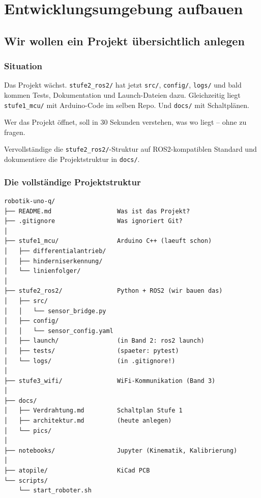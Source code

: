 \part{Entwicklungsumgebung aufbauen}

\chapter{Wir wollen ein Projekt übersichtlich anlegen}

\kapitelstruktur

\section{Situation}

Das Projekt wächst. \texttt{stufe2\_ros2/} hat jetzt
\texttt{src/}, \texttt{config/}, \texttt{logs/} und bald
kommen Tests, Dokumentation und Launch-Dateien dazu.
Gleichzeitig liegt \texttt{stufe1\_mcu/} mit Arduino-Code
im selben Repo. Und \texttt{docs/} mit Schaltplänen.

Wer das Projekt öffnet, soll in 30 Sekunden verstehen,
was wo liegt -- ohne zu fragen.

\begin{aufgabeBox}
Vervollständige die \texttt{stufe2\_ros2/}-Struktur auf
ROS2-kompatiblen Standard und dokumentiere die Projektstruktur
in \texttt{docs/}.
\end{aufgabeBox}

\section{Die vollständige Projektstruktur}

\begin{lstlisting}[style=text]
robotik-uno-q/
├── README.md                  Was ist das Projekt?
├── .gitignore                 Was ignoriert Git?
│
├── stufe1_mcu/                Arduino C++ (laeuft schon)
│   ├── differentialantrieb/
│   ├── hinderniserkennung/
│   └── linienfolger/
│
├── stufe2_ros2/               Python + ROS2 (wir bauen das)
│   ├── src/
│   │   └── sensor_bridge.py
│   ├── config/
│   │   └── sensor_config.yaml
│   ├── launch/                (in Band 2: ros2 launch)
│   ├── tests/                 (spaeter: pytest)
│   └── logs/                  (in .gitignore!)
│
├── stufe3_wifi/               WiFi-Kommunikation (Band 3)
│
├── docs/
│   ├── Verdrahtung.md         Schaltplan Stufe 1
│   ├── architektur.md         (heute anlegen)
│   └── pics/
│
├── notebooks/                 Jupyter (Kinematik, Kalibrierung)
│
├── atopile/                   KiCad PCB
└── scripts/
    └── start_roboter.sh
\end{lstlisting}

